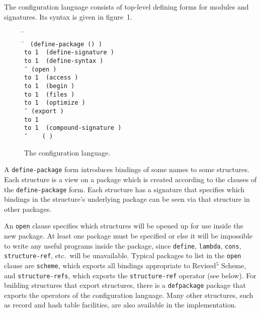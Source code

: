 The configuration language consists of top-level defining forms for
modules and signatures.  Its syntax is given in figure~1.

\hbox{\goesto}
\newcommand{\altz}{\hbox to 1\wd0{\hfil\alt}}


\begin{figure}
\begin{tabbing}
    \=\goesto{}~ \\
    \=\goesto{}~
      \tt(define-package ()
          ) \\
	\>\altz{}~ \tt(define-signature  ) \\
	\>\altz{}~ \tt(define-syntax  ) \\
    \=\goesto{}~ \tt(open ) \\
	\>\altz{}~ \tt(access ) \\
	\>\altz{}~ \tt(begin ) \\
	\>\altz{}~ \tt(files ) \\
	\>\altz{}~ \tt(optimize ) \\
    \=\goesto{}~ \tt(export ) \\
	\>\altz{}~  \\
	\>\altz{}~ \tt(compound-signature ) \\
    \=\goesto{}~  ~\alt{}~ \tt( )
\end{tabbing}
\caption{The configuration language.}
\end{figure}


A {\tt define-package} form introduces bindings of some names to some
structures.  Each structure is a view on a package which is created
according to the clauses of the {\tt define-package} form.  Each
structure has a signature that specifies which bindings in the
structure's underlying package can be seen via that structure in other
packages.

An {\tt open} clause specifies which structures will be opened up for
use inside the new package.  At least one package must be specified or
else it will be impossible to write any useful programs inside the
package, since {\tt define}, {\tt lambda}, {\tt cons}, {\tt
structure-ref}, etc.\ will be unavailable.  Typical packages to list
in the {\tt open} clause are {\tt scheme}, which exports all bindings
appropriate to Revised$^5$ Scheme, and {\tt structure-refs}, which
exports the {\tt structure-ref} operator (see below).  For building
structures that export structures, there is a {\tt defpackage} package
that exports the operators of the configuration language.  Many other
structures, such as record and hash table facilities, are also
available in the \hack{} implementation.

